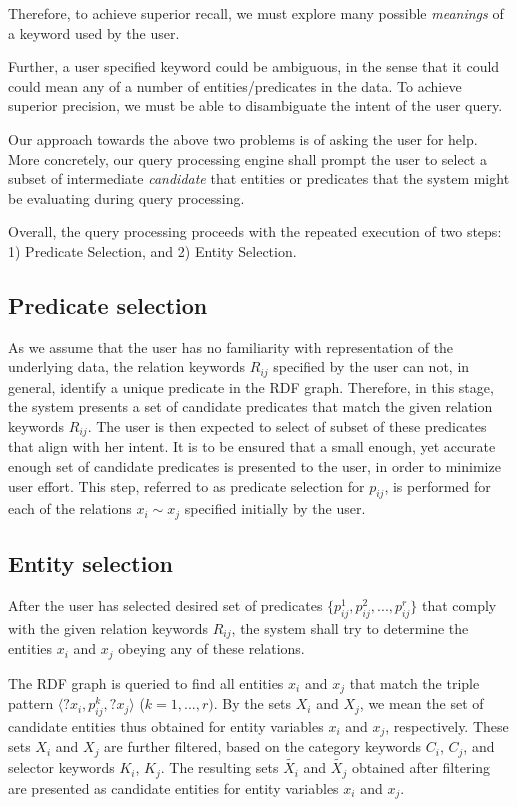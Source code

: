 \documentclass[a4paper, twoside, 12pt]{report}
\begin{document}
Therefore, to achieve superior recall, we must explore many possible \emph{meanings} of a keyword used by the user.

Further, a user specified keyword could be ambiguous, in the sense that it could could mean any of a number of entities/predicates in the data. To achieve superior precision, we must be able to disambiguate the intent of the user query.

Our approach towards the above two problems is of asking the user for help. More concretely, our query processing engine shall prompt the user to select a subset of intermediate \emph{candidate} that entities or predicates that the system might be evaluating during query processing.

Overall, the query processing proceeds with the repeated execution of two steps: 1) Predicate Selection, and 2) Entity Selection.

\subsection{Predicate selection} \label{predsel}

As we assume that the user has no familiarity with representation of the underlying data, the relation keywords $R_{ij}$ specified by the user can not, in general, identify a unique predicate in the RDF graph. Therefore, in this stage, the system presents a set of candidate predicates that match the given relation keywords $R_{ij}$. The user is then expected to select of subset of these predicates that align with her intent. It is to be ensured that a small enough, yet accurate enough set of candidate predicates is presented to the user, in order to minimize user effort. This step, referred to as predicate selection for $p_{ij}$, is performed for each of the relations $x_i \sim x_j$ specified initially by the user.

\subsection{Entity selection}

After the user has selected desired set of predicates $\{p^1_{ij}, p^2_{ij}, ..., p^r_{ij}\}$ that comply with the given relation keywords $R_{ij}$, the system shall try to determine the entities $x_i$ and $x_j$ obeying any of these relations.

The RDF graph is queried to find all entities $x_i$ and $x_j$ that match the triple pattern $\langle ?x_i, p^k_{ij}, ?x_j \rangle$ ($k = 1,...,r)$. By the sets $X_i$ and $X_j$, we mean the set of candidate entities thus obtained for entity variables $x_i$ and $x_j$, respectively. These sets $X_i$ and $X_j$ are further filtered, based on the category keywords $C_i$, $C_j$, and selector keywords $K_i$, $K_j$. The resulting sets $\tilde{X_i}$ and $\tilde{X_j}$ obtained after filtering are presented as candidate entities for entity variables $x_i$ and $x_j$.
\end{document}
